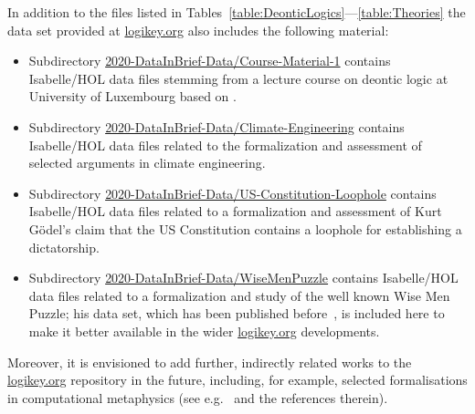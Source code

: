 \documentclass{article}
\begin{document}
In addition to the files listed in
Tables~\ref{table:DeonticLogics}---\ref{table:Theories} the data set
provided at \url{logikey.org} also includes the following material:
\begin{itemize}
\item Subdirectory \url{2020-DataInBrief-Data/Course-Material-1} contains Isabelle/HOL data files stemming from a
  lecture course on deontic logic at University of Luxembourg based on \cite{textbook18}.
\item Subdirectory \url{2020-DataInBrief-Data/Climate-Engineering} contains Isabelle/HOL data files related to the
  formalization and assessment  \cite{C82}  of selected arguments in climate engineering.
\item  Subdirectory \url{2020-DataInBrief-Data/US-Constitution-Loophole} contains Isabelle/HOL data files related to a 
  formalization and assessment  \cite{zahoransky19} of Kurt Gödel's claim that the US Constitution contains a
  loophole for establishing a dictatorship.
\item  Subdirectory \url{2020-DataInBrief-Data/WiseMenPuzzle} contains Isabelle/HOL data files related to a 
  formalization and study \cite{J41} of the well known Wise Men
  Puzzle; his data set, which has been published before~\cite{J44}, is
  included here to make it better available in the wider
  \url{logikey.org} developments.
\end{itemize}

Moreover, it is envisioned to add further, indirectly related works to
  the \url{logikey.org} repository in the future, including,
  for example, 
  selected formalisations in computational metaphysics (see
  e.g.~\cite{J47,J41} and the references therein). 

\end{document}
